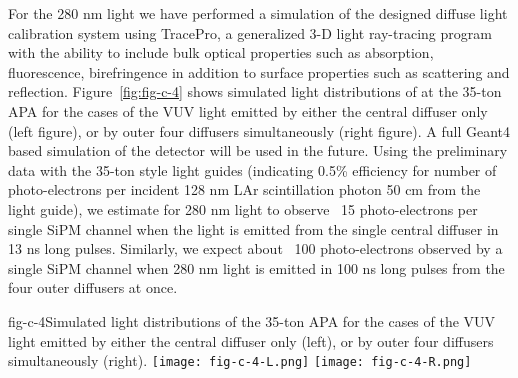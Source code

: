 For the 280 nm light we have performed a simulation of the designed
diffuse light calibration system using TracePro, a generalized 3-D
light ray-tracing program with the ability to include bulk optical
properties such as absorption, fluorescence, birefringence in addition
to surface properties such as scattering and
reflection. Figure~\ref{fig:fig-c-4} shows simulated light distributions
of at the 35-ton APA for the cases of the VUV light emitted by either
the central diffuser only (left figure), or by outer four diffusers
simultaneously (right figure). A full Geant4 based simulation of the
detector will be used in the future. Using the preliminary data with
the 35-ton style light guides (indicating 0.5\% efficiency for number
of photo-electrons per incident 128 nm LAr scintillation photon 50 cm
from the light guide), we estimate for 280 nm light to observe ~15
photo-electrons per single SiPM channel when the light is emitted from
the single central diffuser in 13 ns long pulses. Similarly, we expect
about ~100 photo-electrons observed by a single SiPM channel when 280
nm light is emitted in 100 ns long pulses from the four outer
diffusers at once.

%
\begin{cdrfigure}{fig-c-4}{Simulated light distributions of the 35-ton APA for the cases of the VUV light emitted by either the central diffuser only
  (left), or by outer four diffusers simultaneously (right).}
\texttt{[image: fig-c-4-L.png]}
\texttt{[image: fig-c-4-R.png]}
\end{cdrfigure}


